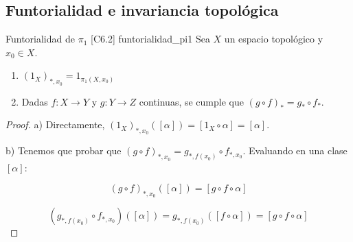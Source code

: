 \subsection{Funtorialidad e invariancia topológica}

\begin{teorema}{Funtorialidad de $\pi_1$ [C6.2] \marcaT}{funtorialidad_pi1}
Sea $X$ un espacio topológico y $x_0 \in X$.
\begin{enumerate}
\item[a)] $(1_X)_{*, x_0} = 1_{\pi_1(X, x_0)}$
\item[b)] Dadas $f \colon X \longrightarrow Y$ y $g \colon Y \longrightarrow Z$ continuas, se cumple que $(g \circ f)_* = g_* \circ f_*$.
\end{enumerate}
\begin{proof}
a) Directamente, $(1_X)_{*, x_0}([\alpha]) = [1_X \circ \alpha] = [\alpha]$.

b) Tenemos que probar que $(g \circ f)_{*, x_0} = g_{*, f(x_0)} \circ f_{*, x_0}$. Evaluando en una clase $[\alpha]$:


$$(g \circ f)_{*, x_0}([\alpha]) = [g \circ f \circ \alpha]$$

$$(g_{*, f(x_0)} \circ f_{*, x_0})([\alpha]) = g_{*, f(x_0)}([f \circ \alpha]) = [g \circ f \circ \alpha]$$
\end{proof}


\end{teorema}


